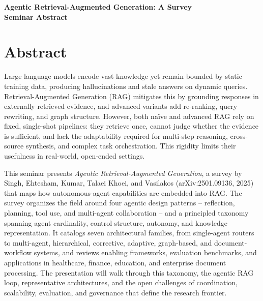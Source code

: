\documentclass[11pt]{article}
\begin{document}
\begin{center}
{\LARGE\bfseries Agentic Retrieval-Augmented Generation: A Survey}\\[1.1em]
{\large\bfseries Seminar Abstract}\\[0.6em]
{\normalsize \seminarDate}
\end{center}
\vspace{0.6em}
\section*{Abstract}
Large language models encode vast knowledge yet remain bounded by static training data, producing hallucinations and stale answers on dynamic queries. Retrieval-Augmented Generation (RAG) mitigates this by grounding responses in externally retrieved evidence, and advanced variants add re-ranking, query rewriting, and graph structure. However, both na\"ive and advanced RAG rely on fixed, single-shot pipelines: they retrieve once, cannot judge whether the evidence is sufficient, and lack the adaptability required for multi-step reasoning, cross-source synthesis, and complex task orchestration. This rigidity limits their usefulness in real-world, open-ended settings.

This seminar presents \emph{Agentic Retrieval-Augmented Generation}, a survey by Singh, Ehtesham, Kumar, Talaei Khoei, and Vasilakos (arXiv:2501.09136, 2025) that maps how autonomous-agent capabilities are embedded into RAG. The survey organizes the field around four agentic design patterns -- reflection, planning, tool use, and multi-agent collaboration -- and a principled taxonomy spanning agent cardinality, control structure, autonomy, and knowledge representation. It catalogs seven architectural families, from single-agent routers to multi-agent, hierarchical, corrective, adaptive, graph-based, and document-workflow systems, and reviews enabling frameworks, evaluation benchmarks, and applications in healthcare, finance, education, and enterprise document processing. The presentation will walk through this taxonomy, the agentic RAG loop, representative architectures, and the open challenges of coordination, scalability, evaluation, and governance that define the research frontier.
\end{document}
